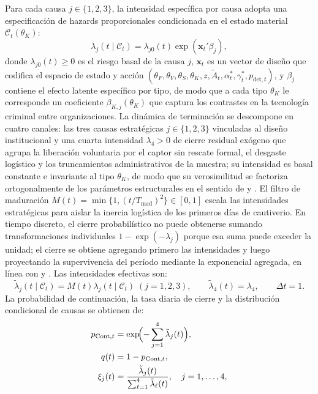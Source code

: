 \documentclass[review,authoryear,12pt]{elsarticle}
\theoremstyle{plain}
\theoremstyle{definition}
\newcommand{\1}{\mathbf{1}}
\begin{document}
Para cada causa $j\in\{1,2,3\}$, la intensidad específica por causa adopta una especificación de hazards proporcionales condicionada en el estado material $\mathcal{C}_t(\theta_K)$:
\begin{equation}
\lambda_j(t\mid\mathcal{C}_t)=\lambda_{j0}(t)\exp(\mathbf{x}_t'\beta_j),
\label{eq:lambda-j}
\end{equation}
donde $\lambda_{j0}(t)\ge 0$ es el riesgo basal de la causa $j$, $\mathbf{x}_t$ es un vector de diseño que codifica el espacio de estado y acción $(\theta_F,\theta_V,\theta_S,\theta_K,z,\tilde{A}_t,\alpha_t^\ast,\gamma_t^\ast,p_{\mathrm{det},t})$, y $\beta_j$ contiene el efecto latente específico por tipo, de modo que a cada tipo $\theta_K$ le corresponde un coeficiente $\beta_{K,j}(\theta_K)$ que captura los contrastes en la tecnología criminal entre organizaciones. La dinámica de terminación se descompone en cuatro canales: las tres causas estratégicas $j\in\{1,2,3\}$ vinculadas al diseño institucional y una cuarta intensidad $\lambda_4>0$ de cierre residual exógeno que agrupa la liberación voluntaria por el captor sin rescate formal, el desgaste logístico y los truncamientos administrativos de la muestra; su intensidad es basal constante e invariante al tipo $\theta_K$, de modo que su verosimilitud se factoriza ortogonalmente de los parámetros estructurales en el sentido de \citet{Lancaster1990} y \citet{AbbringVanDenBerg2003}. El filtro de maduración $M(t)=\min\{1,(t/T_{\mathrm{mad}})^2\}\in[0,1]$ escala las intensidades estratégicas para aislar la inercia logística de los primeros días de cautiverio. En tiempo discreto, el cierre probabilístico no puede obtenerse sumando transformaciones individuales $1-\exp(-\lambda_j)$ porque esa suma puede exceder la unidad; el cierre se obtiene agregando primero las intensidades y luego proyectando la supervivencia del período mediante la exponencial agregada, en línea con \citet{Sueyoshi1992} y \citet{Wooldridge2010}. Las intensidades efectivas son:
\begin{equation}
\tilde{\lambda}_j(t\mid\mathcal{C}_t)=M(t)\lambda_j(t\mid\mathcal{C}_t)\;(j=1,2,3),\qquad\tilde{\lambda}_4(t)=\lambda_4,\qquad\Delta t=1.
\label{eq:hj}
\end{equation}
La probabilidad de continuación, la tasa diaria de cierre y la distribución condicional de causas se obtienen de:
\begin{align}
p_{\mathrm{Cont},t} &= \exp\!\Bigl(-\sum_{j=1}^{4}\tilde{\lambda}_j(t)\Bigr),\label{eq:pCont}\\
q(t) &= 1-p_{\mathrm{Cont},t},\label{eq:q}\\
\xi_j(t) &= \frac{\tilde{\lambda}_j(t)}{\sum_{\ell=1}^{4}\tilde{\lambda}_\ell(t)},\quad j=1,\ldots,4,\label{eq:xi}
\end{align}
\end{document}
